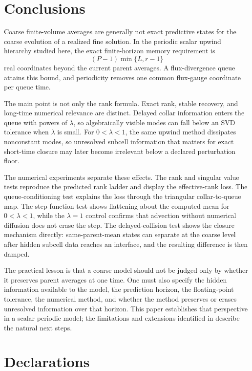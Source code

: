 \documentclass[pdflatex,sn-mathphys-num]{sn-jnl}%
\theoremstyle{thmstyleone}%
\theoremstyle{thmstyletwo}%
\theoremstyle{thmstylethree}%
\begin{document}
\section{Conclusions} \label{sec:conc}

Coarse finite-volume averages are generally not exact predictive states for
the coarse evolution of a realized fine solution.  In the periodic scalar
upwind hierarchy studied here, the exact finite-horizon memory requirement
is
\[
  (P-1)\min\{L,r-1\}
\]
real coordinates beyond the current parent averages.  A flux-divergence
queue attains this bound, and periodicity removes one common flux-gauge
coordinate per queue time.

The main point is not only the rank formula.  Exact rank, stable recovery, and long-time numerical relevance are distinct.
Delayed collar information enters the queue with powers of \(\lambda\), so
algebraically visible modes can fall below an SVD tolerance when \(\lambda\)
is small.  For \(0<\lambda<1\), the same upwind method dissipates nonconstant modes, so unresolved subcell information that matters for exact short-time closure may later become irrelevant below a declared perturbation floor.

The numerical experiments separate these effects. The rank and singular value tests reproduce the predicted rank ladder and display the effective-rank loss. The queue-conditioning test explains the loss through the triangular
collar-to-queue map.  The step-function test shows flattening about the computed mean for \(0<\lambda<1\), while the \(\lambda=1\) control confirms that advection without numerical diffusion does not erase the step.  The delayed-collision test shows the closure mechanism directly: same-parent-mean states can separate at the coarse level after hidden subcell data reaches an interface, and the resulting difference is then damped.

The practical lesson is that a coarse model should not be judged only by
whether it preserves parent averages at one time.  One must also specify the
hidden information available to the model, the prediction horizon, the
floating-point tolerance, the numerical method, and whether the method
preserves or erases unresolved information over that horizon.  This paper establishes that perspective in a scalar periodic model; the limitations and extensions identified in  describe the natural next steps.

\section*{Declarations}
\end{document}
